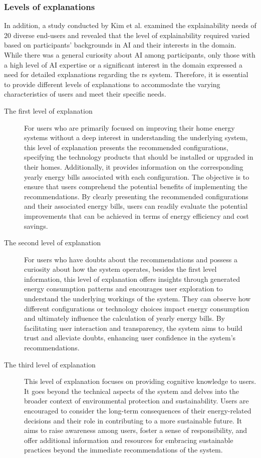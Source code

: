 \subsubsection{Levels of explanations}

In addition, a study conducted by Kim et al. \cite{Kim2023} examined the explainability needs of 20 diverse end-users 
and revealed that the level of explainability required varied based on participants' backgrounds in AI and their interests in the domain. 
While there was a general curiosity about AI among participants, only those with a high level of AI expertise or a significant interest in the domain expressed a need for detailed explanations regarding the \gls{rs} system. 
Therefore, it is essential to provide different levels of explanations to accommodate the varying characteristics of users and meet their specific needs. 
\begin{description}
  \item[The first level of explanation] For users who are primarily focused on improving their home energy systems without a deep interest in understanding the underlying system, 
    this level of explanation presents the recommended configurations, specifying the technology products that should be installed or upgraded in their homes. 
    Additionally, it provides information on the corresponding yearly energy bills associated with each configuration. 
    The objective is to ensure that users comprehend the potential benefits of implementing the recommendations. By clearly presenting the recommended configurations and their associated energy bills, users can readily evaluate the potential improvements that can be achieved in terms of energy efficiency and cost savings. 
  \item[The second level of explanation] For users who have doubts about the recommendations and possess a curiosity about how the system operates, 
    besides the first level information, this level of explanation offers insights through generated energy consumption patterns and encourages user exploration to understand the underlying workings of the system. 
    They can observe how different configurations or technology choices impact energy consumption and ultimately influence the calculation of yearly energy bills. 
    By facilitating user interaction and transparency, the system aims to build trust and alleviate doubts, enhancing user confidence in the system's recommendations.
  \item[The third level of explanation] This level of explanation focuses on providing cognitive knowledge to users. 
    It goes beyond the technical aspects of the system and delves into the broader context of environmental protection and sustainability. 
    Users are encouraged to consider the long-term consequences of their energy-related decisions and their role in contributing to a more sustainable future. 
    It aims to raise awareness among users, foster a sense of responsibility, and offer additional information and resources for embracing sustainable practices beyond the immediate recommendations of the system.
\end{description}


